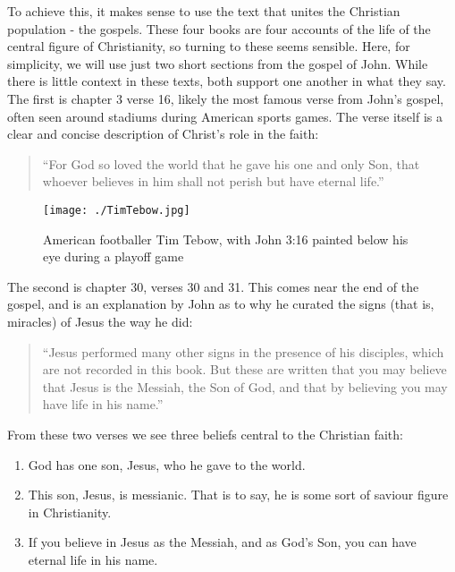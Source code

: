 \documentclass[]{article}
\providecommand{\tightlist}{%
  \setlength{\itemsep}{0pt}\setlength{\parskip}{0pt}}
\begin{document}
To achieve this, it makes sense to use the text that unites the
Christian population - the gospels. These four books are four accounts
of the life of the central figure of Christianity, so turning to these
seems sensible. Here, for simplicity, we will use just two short
sections from the gospel of John. While there is little context in these
texts, both support one another in what they say. The first is chapter 3
verse 16, likely the most famous verse from John's gospel, often seen
around stadiums during American sports games. The verse itself is a
clear and concise description of Christ's role in the faith:

\begin{quote}
``For God so loved the world that he gave his one and only Son, that
whoever believes in him shall not perish but have eternal
life.''\autocite[pg 1035]{HolyBibleNew2007}
\end{quote}

\begin{figure}
\centering
\texttt{[image: ./TimTebow.jpg]}
\caption{American footballer Tim Tebow, with John 3:16 painted below his
eye during a playoff game}
\end{figure}

The second is chapter 30, verses 30 and 31. This comes near the end of
the gospel, and is an explanation by John as to why he curated the signs
(that is, miracles) of Jesus the way he did:

\begin{quote}
``Jesus performed many other signs in the presence of his disciples,
which are not recorded in this book. But these are written that you may
believe that Jesus is the Messiah, the Son of God, and that by believing
you may have life in his name.''\autocite[pg 1057]{HolyBibleNew2007}
\end{quote}

From these two verses we see three beliefs central to the Christian
faith:

\begin{enumerate}
\def\labelenumi{\arabic{enumi}.}
\tightlist
\item
  God has one son, Jesus, who he gave to the world.
\item
  This son, Jesus, is messianic. That is to say, he is some sort of
  saviour figure in Christianity.
\item
  If you believe in Jesus as the Messiah, and as God's Son, you can have
  eternal life in his name.
\end{enumerate}
\end{document}
